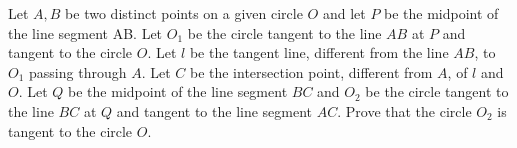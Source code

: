 Let $A,B$ be two distinct points on a given circle $O$ and let $P$ be the midpoint of the line segment AB. Let $O_1$ be the circle tangent to the line $AB$ at $P$ and tangent to the circle $O$. Let $l$ be the tangent line, different from the line $AB$, to $O_1$ passing through $A$. Let $C$ be the intersection point, different from $A$, of $l$ and $O$. Let $Q$ be the midpoint of the line segment $BC$ and $O_2$ be the circle tangent to the line $BC$ at $Q$ and tangent to the line segment $AC$. Prove that the circle $O_2$ is tangent to the circle $O$.